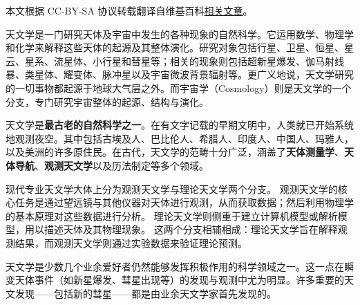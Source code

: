 
本文根据 CC-BY-SA 协议转载翻译自维基百科\href{https://en.wikipedia.org/wiki/Astronomy?utm_source=chatgpt.com}{相关文章}。

天文学是一门研究天体及宇宙中发生的各种现象的自然科学。它运用数学、物理学和化学来解释这些天体的起源及其整体演化。研究对象包括行星、卫星、恒星、星云、星系、流星体、小行星和彗星等；相关的现象则包括超新星爆发、伽马射线暴、类星体、耀变体、脉冲星以及宇宙微波背景辐射等。更广义地说，天文学研究的一切事物都起源于地球大气层之外。而宇宙学（Cosmology）则是天文学的一个分支，专门研究宇宙整体的起源、结构与演化。

天文学是\textbf{最古老的自然科学之一}。在有文字记载的早期文明中，人类就已开始系统地观测夜空。其中包括古埃及人、巴比伦人、希腊人、印度人、中国人、玛雅人，以及美洲的许多原住民。在古代，天文学的范畴十分广泛，涵盖了\textbf{天体测量学}、\textbf{天体导航}、\textbf{观测天文学}以及历法制定等多个领域。

现代专业天文学大体上分为观测天文学与理论天文学两个分支。  
观测天文学的核心任务是通过望远镜与其他仪器对天体进行观测，从而获取数据；然后利用物理学的基本原理对这些数据进行分析。  
理论天文学则侧重于建立计算机模型或解析模型，用以描述天体及其物理现象。  
这两个分支相辅相成：理论天文学旨在解释观测结果，而观测天文学则通过实验数据来验证理论预测。

天文学是少数几个业余爱好者仍然能够发挥积极作用的科学领域之一。这一点在瞬变天体事件（如新星爆发、彗星出现等）的发现与观测中尤为明显。许多重要的天文发现——包括新的彗星——都是由业余天文学家首先发现的。


